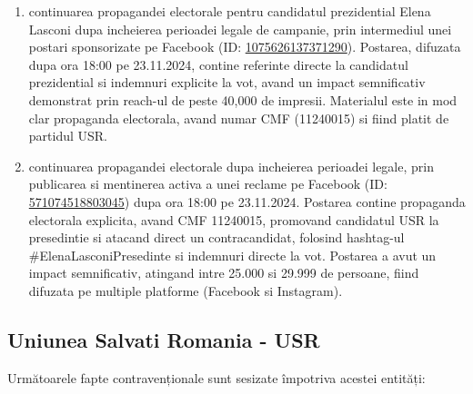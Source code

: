 \documentclass[a4paper,12pt]{article}
\begin{document}
\begin{enumerate}[leftmargin=*, label=\arabic*.)]
    \item continuarea propagandei electorale pentru candidatul prezidential Elena Lasconi dupa incheierea perioadei legale de campanie, prin intermediul unei postari sponsorizate pe Facebook (ID: \href{https://www.facebook.com/ads/library/?id=1075626137371290}{1075626137371290}). Postarea, difuzata dupa ora 18:00 pe 23.11.2024, contine referinte directe la candidatul prezidential si indemnuri explicite la vot, avand un impact semnificativ demonstrat prin reach-ul de peste 40,000 de impresii. Materialul este in mod clar propaganda electorala, avand numar CMF (11240015) si fiind platit de partidul USR.
    \item continuarea propagandei electorale dupa incheierea perioadei legale, prin publicarea si mentinerea activa a unei reclame pe Facebook (ID: \href{https://www.facebook.com/ads/library/?id=571074518803045}{571074518803045}) dupa ora 18:00 pe 23.11.2024. Postarea contine propaganda electorala explicita, avand CMF 11240015, promovand candidatul USR la presedintie si atacand direct un contracandidat, folosind hashtag-ul \#ElenaLasconiPresedinte si indemnuri directe la vot. Postarea a avut un impact semnificativ, atingand intre 25.000 si 29.999 de persoane, fiind difuzata pe multiple platforme (Facebook si Instagram).
\end{enumerate}

\vspace{0.5cm}

\subsection{Uniunea Salvati Romania - USR}
Următoarele fapte contravenționale sunt sesizate împotriva acestei entități:
\end{document}
